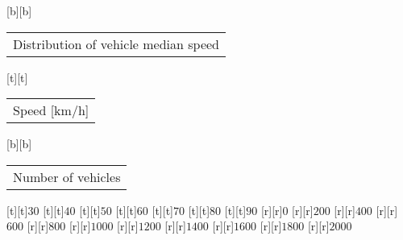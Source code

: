 [b][b]{\fontsize{8}{12}\selectfont \setlength{\tabcolsep}{0pt}\begin{tabular}{c}Distribution of vehicle median speed\end{tabular}}%
[t][t]{\fontsize{8}{12}\selectfont \setlength{\tabcolsep}{0pt}\begin{tabular}{c}Speed [km/h]\end{tabular}}%
[b][b]{\fontsize{8}{12}\selectfont \setlength{\tabcolsep}{0pt}\begin{tabular}{c}Number of vehicles\end{tabular}}%
%
\fontsize{6}{8}%
\selectfont%
%
[t][t]{$30$}%
[t][t]{$40$}%
[t][t]{$50$}%
[t][t]{$60$}%
[t][t]{$70$}%
[t][t]{$80$}%
[t][t]{$90$}%
%
[r][r]{$0$}%
[r][r]{$200$}%
[r][r]{$400$}%
[r][r]{$600$}%
[r][r]{$800$}%
[r][r]{$1000$}%
[r][r]{$1200$}%
[r][r]{$1400$}%
[r][r]{$1600$}%
[r][r]{$1800$}%
[r][r]{$2000$}%
%
%
